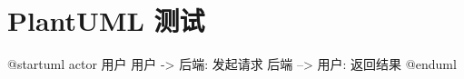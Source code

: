 \documentclass{ctexart}
\begin{document}
\section{PlantUML 测试}
\begin{plantuml}
@startuml
actor 用户
用户 -> 后端: 发起请求
后端 --> 用户: 返回结果
@enduml
\end{plantuml}
\end{document}
